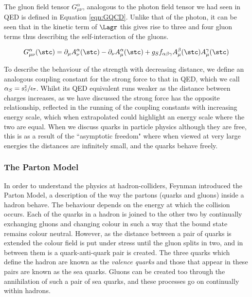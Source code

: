 The gluon field tensor $G^{\alpha}_{\mu \nu}$, analogous to the photon field tensor we had seen in QED is defined in Equation \ref{eqn:GQCD}. Unlike that of the photon, it can be seen that in the kinetic term of $\Lagr$ this gives rise to three and four gluon terms thus describing the self-interaction of the gluons. 

\begin{equation}
G^{\alpha}_{\mu \nu} (\stc) = \partial_{\mu} A^{\alpha}_{\nu} (\stc) - \partial_{\nu}A^{\alpha}_{\mu}(\stc) + g_{S} f_{\alpha \beta \gamma} A^{\beta}_{\mu}(\stc)A^{\gamma}_{\mu}(\stc)
\label{eqn:GQCD}
\end{equation}



 To describe the behaviour of the strength with decreasing distance, we define an analogous coupling constant for the strong force to that in QED, which we call $\alpha_{S} = \sfrac{g_{S}^{2}}{4\pi}$. Whilst its QED equivalent runs weaker as the distance between charges increases, as we have discussed the strong force has the opposite relationship, reflected in the running of the coupling constants with increasing energy scale, which when extrapolated could highlight an energy scale where the two are equal. When we discuss quarks in particle physics although they are free, this is as a result of the ``asymptotic freedom" where when viewed at very large energies the distances are infinitely small, and the quarks behave freely. 
 
 \subsubsection{The Parton Model}
 
 In order to understand the physics at hadron-colliders, Feynman introduced the Parton Model, a description of the way the partons (quarks and gluons) inside a hadron behave. The behaviour depends on the energy at which the collision occurs. Each of the quarks in a hadron is joined to the other two by continually exchanging gluons and changing colour in such a way that the bound state remains colour neutral. However, as the distance between a pair of quarks is extended the colour field is put under stress until the gluon splits in two, and in between them is a quark-anti-quark pair is created. The three quarks which define the hadron are known as the \textit{valence quarks} and those that appear in these pairs are known as the sea quarks. Gluons can be  created too through the annihilation of such a pair of sea quarks, and these processes go on continually within hadrons. 
 

